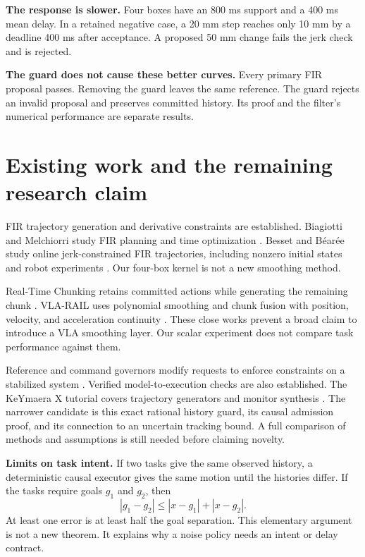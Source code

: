 \documentclass[11pt,letterpaper]{article}
\begin{document}
\textbf{The response is slower.} Four boxes have an 800 ms support and a 400 ms mean delay. In a retained negative case, a 20 mm step reaches only 10 mm by a deadline 400 ms after acceptance. A proposed 50 mm change fails the jerk check and is rejected.

\textbf{The guard does not cause these better curves.} Every primary FIR proposal passes. Removing the guard leaves the same reference. The guard rejects an invalid proposal and preserves committed history. Its proof and the filter's numerical performance are separate results.

\newpage


\newpage
\section{Existing work and the remaining research claim}
FIR trajectory generation and derivative constraints are established. Biagiotti and Melchiorri study FIR planning and time optimization \cite{fir2012,fir2019}. Besset and B\'ear\'ee study online jerk-constrained FIR trajectories, including nonzero initial states and robot experiments \cite{fir2017}. Our four-box kernel is not a new smoothing method.

Real-Time Chunking retains committed actions while generating the remaining chunk \cite{rtc}. VLA-RAIL uses polynomial smoothing and chunk fusion with position, velocity, and acceleration continuity \cite{rail}. These close works prevent a broad claim to introduce a VLA smoothing layer. Our scalar experiment does not compare task performance against them.

Reference and command governors modify requests to enforce constraints on a stabilized system \cite{governors}. Verified model-to-execution checks are also established. The KeYmaera X tutorial covers trajectory generators and monitor synthesis \cite{keymaera}. The narrower candidate is this exact rational history guard, its causal admission proof, and its connection to an uncertain tracking bound. A full comparison of methods and assumptions is still needed before claiming novelty.

\textbf{Limits on task intent.} If two tasks give the same observed history, a deterministic causal executor gives the same motion until the histories differ. If the tasks require goals $g_1$ and $g_2$, then
\[
|g_1-g_2|\leq |x-g_1|+|x-g_2|.
\]
At least one error is at least half the goal separation. This elementary argument is not a new theorem. It explains why a noise policy needs an intent or delay contract.
\end{document}
